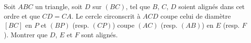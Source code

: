 Soit $ABC$ un triangle, soit $D$ sur $(BC)$, tel que $B$, $C$, $D$ soient alignés dans cet ordre et que $CD = CA$. Le cercle circonscrit à $ACD$ coupe celui de diamètre $[BC]$ en $P$ et $(BP)$ (resp. $(CP)$) coupe $(AC)$ (resp. $(AB)$) en $E$ (resp. $F$). Montrer que $D$, $E$ et $F$ sont alignés.
